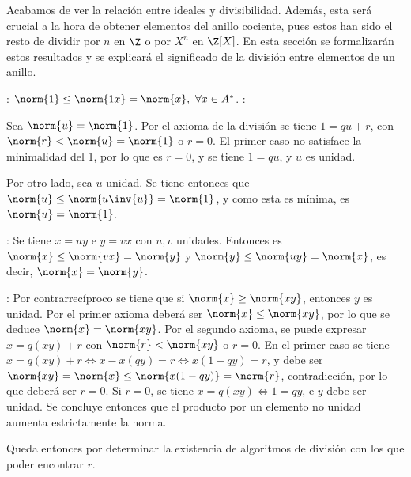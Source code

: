 \begin{TFGampliado}
    Acabamos de ver la relación entre ideales y divisibilidad. Además, esta será crucial a la hora de obtener elementos del anillo cociente, pues estos han sido el resto de dividir por $n$ en $\Z$ o por $X^n$ en $\Z[X]$. En esta sección se formalizarán estos resultados y se explicará el significado de la división entre elementos de un anillo.
\end{TFGampliado}

\begin{TFGampliado}
            : $\norm{1} \leq \norm{1x} = \norm{x},\ \forall x\in A^*$.
            :
        
            Sea $\norm{u} = \norm{1}$. Por el axioma de la división se tiene $1 = qu + r$, con $\norm{r} < \norm{u} = \norm{1}$ o $r = 0$. El primer caso no satisface la minimalidad del 1, por lo que es $r=0$, y se tiene $1 = qu$, y $u$ es unidad.
        
            Por otro lado, sea $u$ unidad. Se tiene entonces que $\norm{u} \leq \norm{u\inv{u}} = \norm{1}$, y como esta es mínima, es $\norm{u} = \norm{1}$.

            :
            Se tiene $x = uy$ e $y = vx$ con $u,v$ unidades. Entonces es $\norm{x} \leq \norm{vx} = \norm{y}$ y $\norm{y} \leq \norm{uy} = \norm{x}$, es decir, $\norm{x} = \norm{y}$.

            : 
            Por contrarrecíproco se tiene que si $\norm{x} \geq \norm{xy}$, entonces $y$ es unidad. Por el primer axioma deberá ser $\norm{x} \leq \norm{xy}$, por lo que se deduce $\norm{x} = \norm{xy}$. Por el segundo axioma, se puede expresar $x = q(xy) + r$ con $\norm{r} < \norm{xy}$ o $r=0$. En el primer caso se tiene $x = q(xy) + r \iff  x - x(qy)=  r \iff x(1-qy) = r $, y debe ser $\norm{xy} = \norm{x} \leq \norm{x(1-qy)} = \norm{r}$, contradicción, por lo que deberá ser $r = 0$. Si $r = 0$, se tiene $x = q(xy) \iff 1 = qy$, e $y$ debe ser unidad. Se concluye entonces que el producto por un elemento no unidad aumenta estrictamente la norma.
        \end{TFGampliado}


\begin{TFGampliado}
            Queda entonces por determinar la existencia de algoritmos de división con los que poder encontrar $r$.
    \end{TFGampliado}


